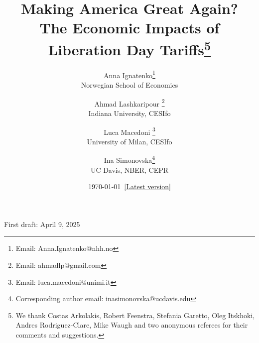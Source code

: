 \documentclass[12pt]{article}
\date{\today \  \href{https://alashkar.pages.iu.edu/ILMS_tariff_analysis.pdf}{[Latest version]} }
\begin{document}
\title{Making America Great Again? \\ The Economic Impacts of Liberation Day Tariffs\footnote{We thank Costas Arkolakis, Robert Feenstra, Stefania Garetto, Oleg Itskhoki, Andres Rodriguez-Clare, Mike Waugh and two anonymous referees for their comments and suggestions.}}

\author{
Anna Ignatenko\footnote{Email: Anna.Ignatenko@nhh.no}
\smallskip{}\\
Norwegian School of Economics
 \and 
Ahmad Lashkaripour \footnote{Email: ahmadlp@gmail.com}
\smallskip{}\\
Indiana University, CESIfo
\and
Luca Macedoni \footnote{Email: luca.macedoni@unimi.it}
\smallskip{}\\
University of Milan, CESIfo 
\and 
Ina Simonovska\footnote{Corresponding author email: inasimonovska@ucdavis.edu}
 \smallskip{}\\
UC Davis, NBER, CEPR
\bigskip{}}


\maketitle
\vspace{-15 mm}
\begin{center}
\large{First draft: April 9, 2025}
\end{center}

\onehalfspacing

\vspace{-4 mm}
\end{document}
